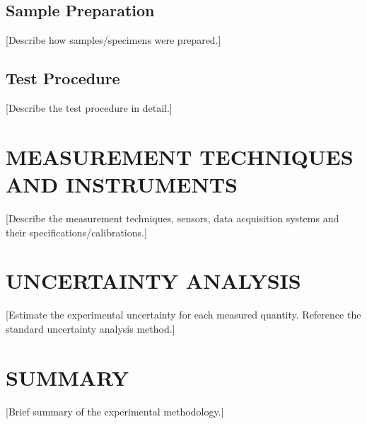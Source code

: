 \subsection{Sample Preparation}

[Describe how samples/specimens were prepared.]

\subsection{Test Procedure}

[Describe the test procedure in detail.]

\section{MEASUREMENT TECHNIQUES AND INSTRUMENTS}

[Describe the measurement techniques, sensors, data acquisition
systems and their specifications/calibrations.]

\section{UNCERTAINTY ANALYSIS}

[Estimate the experimental uncertainty for each measured
quantity. Reference the standard uncertainty analysis method.]

\section{SUMMARY}

[Brief summary of the experimental methodology.]
